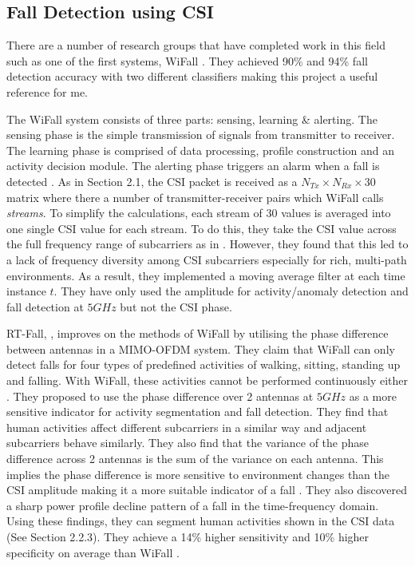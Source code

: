 \subsection{Fall Detection using CSI}
There are a number of research groups that have completed work in this field such as one of the first systems, WiFall \citep{WiFall}. They achieved 90\% and 94\% fall detection accuracy with two different classifiers making this project a useful reference for me. \par
The WiFall system consists of three parts: sensing, learning \& alerting. The sensing phase is the simple transmission of signals from transmitter to receiver. The learning phase is comprised of data processing, profile construction and an activity decision module. The alerting phase triggers an alarm when a fall is detected \citep{WiFall}. As in Section 2.1, the CSI packet is received as a $N_{Tx}\times N_{Rx}\times 30$ matrix where there a number of transmitter-receiver pairs which WiFall calls \textit{streams}. To simplify the calculations, each stream of 30 values is averaged into one single CSI value for each stream. To do this, they take the CSI value across the full frequency range of subcarriers as in \cite{FilaIndoor}. However, they found that this led to a lack of frequency diversity among CSI subcarriers especially for rich, multi-path environments. As a result, they implemented a moving average filter at each time instance $t$. They have only used the amplitude for activity/anomaly detection and fall detection at $5GHz$ but not the CSI phase. \par
RT-Fall, \cite{RTFall}, improves on the methods of WiFall by utilising the phase difference between antennas in a MIMO-OFDM system. They claim that WiFall can only detect falls for four types of predefined activities of walking, sitting, standing up and falling. With WiFall, these activities cannot be performed continuously either \citep{RTFall}. They proposed to use the phase difference over 2 antennas at $5GHz$ as a more sensitive indicator for activity segmentation and fall detection. They find that human activities affect different subcarriers in a similar way and adjacent subcarriers behave similarly. They also find that the variance of the phase difference across 2 antennas is the sum of the variance on each antenna. This implies the phase difference is more sensitive to environment changes than the CSI amplitude making it a more suitable indicator of a fall \citep{PhaseU}. They also discovered a sharp power profile decline pattern of a fall in the time-frequency domain. Using these findings, they can segment human activities shown in the CSI data (See Section 2.2.3). They achieve a 14\% higher sensitivity and 10\% higher specificity on average than WiFall \citep{RTFall}.
